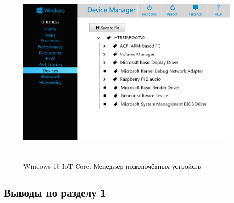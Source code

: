 \begin{figure}[h!]
  \centering
  \includegraphics[height=9.5cm]{img/win10-settings}
  \vspace*{12pt}
  \caption{Windows 10 IoT Core: Менеджер подключённых устройств}\label{fig:win10-settings}
\end{figure}

\subsection{Выводы по разделу 1}

\newpage
